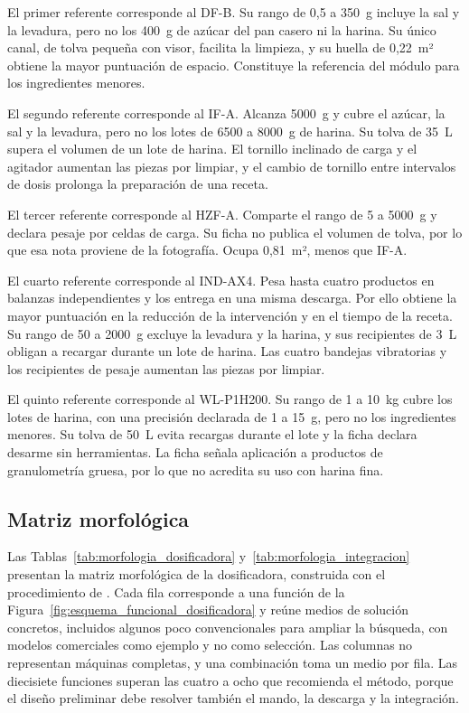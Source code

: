 El primer referente corresponde al DF-B. Su rango de 0,5 a 350~g
incluye la sal y la levadura, pero no los 400~g de azúcar del pan
casero ni la harina. Su único canal, de tolva pequeña con visor,
facilita la limpieza, y su huella de 0,22~m² obtiene la mayor
puntuación de espacio. Constituye la referencia del módulo para los
ingredientes menores.

El segundo referente corresponde al IF-A. Alcanza 5000~g y cubre el
azúcar, la sal y la levadura, pero no los lotes de 6500 a 8000~g de
harina. Su tolva de 35~L supera el volumen de un lote de harina. El
tornillo inclinado de carga y el agitador aumentan las piezas por
limpiar, y el cambio de tornillo entre intervalos de dosis prolonga
la preparación de una receta.

El tercer referente corresponde al HZF-A. Comparte el rango de 5 a
5000~g y declara pesaje por celdas de carga. Su ficha no publica el
volumen de tolva, por lo que esa nota proviene de la fotografía.
Ocupa 0,81~m², menos que IF-A.

El cuarto referente corresponde al IND-AX4. Pesa hasta cuatro productos
en balanzas independientes y los entrega en una misma descarga. Por
ello obtiene la mayor puntuación en la reducción de la intervención y
en el tiempo de la receta. Su rango de 50 a 2000~g excluye la levadura
y la harina, y sus recipientes de 3~L obligan a recargar durante un
lote de harina. Las cuatro bandejas vibratorias y los recipientes de
pesaje aumentan las piezas por limpiar.

El quinto referente corresponde al WL-P1H200. Su rango de 1 a 10~kg
cubre los lotes de harina, con una precisión declarada de 1 a 15~g,
pero no los ingredientes menores. Su tolva de 50~L evita recargas
durante el lote y la ficha declara desarme sin herramientas. La ficha
señala aplicación a productos de granulometría gruesa, por lo que no
acredita su uso con harina fina.



\subsection{Matriz morfológica}

Las Tablas~\ref{tab:morfologia_dosificadora}
y~\ref{tab:morfologia_integracion} presentan la matriz morfológica de
la dosificadora, construida con el procedimiento de
\textcite{cross2021design}. Cada fila corresponde a una función de la
Figura~\ref{fig:esquema_funcional_dosificadora} y reúne medios de
solución concretos, incluidos algunos poco convencionales para ampliar
la búsqueda, con modelos comerciales como ejemplo y no como selección.
Las columnas no representan máquinas completas, y una combinación toma
un medio por fila. Las diecisiete funciones superan las cuatro a ocho que
recomienda el método, porque el diseño preliminar debe resolver también
el mando, la descarga y la integración.

